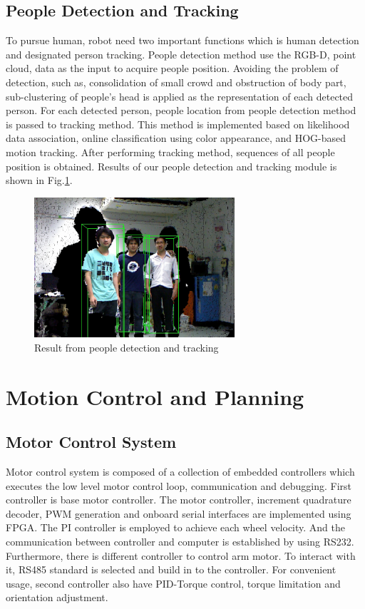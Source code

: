 \documentclass{llncs}
\begin{document}
\subsection{People Detection and Tracking}

To pursue human, robot need two important functions which is human detection and designated person tracking. People detection method use the RGB-D, point cloud, data as the input to acquire people position. Avoiding the problem of detection, such as, consolidation of small crowd and obstruction of body part, sub-clustering of people's head is applied as the representation of each detected person. For each detected person, people location from people detection method is passed to tracking method. This method is implemented based on likelihood data association, online classification using color appearance, and HOG-based motion tracking\cite{pp_detect}. After performing tracking method, sequences of all people position is obtained. Results of our people detection and tracking module is shown in Fig.\ref{fig:people_detection}.

\begin{figure}
\centering
\includegraphics[height=5.2cm]{people_detection_figure}
\caption{Result from people detection and tracking}
\label{fig:people_detection}
\end{figure}

\section{Motion Control and Planning}

\subsection{Motor Control System}

Motor control system is composed of a collection of embedded controllers which executes the low level motor control loop, communication and debugging. First controller is base motor controller. The motor controller, increment quadrature decoder, PWM generation and onboard serial interfaces are implemented using FPGA. The PI controller is employed to achieve each wheel velocity. And the communication between controller and computer is established by using RS232. Furthermore, there is different controller to control arm motor. To interact with it, RS485 standard is selected and build in to the controller. For convenient usage, second controller also have PID-Torque control, torque limitation and orientation adjustment. 
\end{document}
